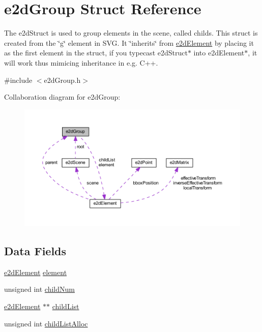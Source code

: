 \hypertarget{structe2d_group}{\section{e2d\-Group Struct Reference}
\label{structe2d_group}
}


The e2d\-Struct is used to group elements in the scene, called childs. This struct is created from the \char`\"{}g\char`\"{} element in S\-V\-G. It \char`\"{}inherits\char`\"{} from \hyperlink{structe2d_element}{e2d\-Element} by placing it as the first element in the struct, if you typecast e2d\-Struct$\ast$ into e2d\-Element$\ast$, it will work thus mimicing inheritance in e.\-g. C++.  




{\ttfamily \#include $<$e2d\-Group.\-h$>$}



Collaboration diagram for e2d\-Group\-:\nopagebreak
\begin{figure}[H]
\begin{center}
\leavevmode
\includegraphics[width=350pt]{structe2d_group__coll__graph}
\end{center}
\end{figure}
\subsection*{Data Fields}
\begin{DoxyCompactItemize}
\item 
\hyperlink{structe2d_element}{e2d\-Element} \hyperlink{structe2d_group_a55bc7a3a0af41fba9e5b91f390c5928c}{element}
\item 
unsigned int \hyperlink{structe2d_group_a0af3697c2c9df6ed0ddd340cded35d65}{child\-Num}
\item 
\hyperlink{structe2d_element}{e2d\-Element} $\ast$$\ast$ \hyperlink{structe2d_group_a55f6dde874716dc99dcd270fc0999a01}{child\-List}
\item 
unsigned int \hyperlink{structe2d_group_a9c89d7cf35b835ef1917855c78a79cc5}{child\-List\-Alloc}
\end{DoxyCompactItemize}


